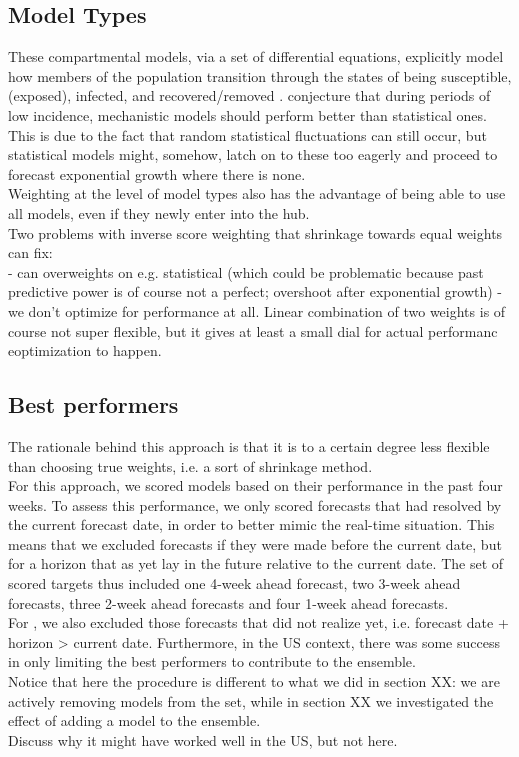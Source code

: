 \subsection{Model Types}
These compartmental models, via a set of differential equations, explicitly model how members of the population transition through the states of being susceptible, (exposed), infected, and recovered/removed \cite{taylor_combining_2021}.
\cite{taylor_combining_2021} conjecture that during periods of low incidence, mechanistic models should perform better than statistical ones. This is due to the fact that random statistical fluctuations can still occur, but statistical models might, somehow, latch on to these too eagerly and proceed to forecast exponential growth where there is none.\\
Weighting at the level of model types also has the advantage of being able to use all models, even if they newly enter into the hub.\\
Two problems with inverse score weighting that shrinkage towards equal weights can fix: \\
- can overweights on e.g. statistical (which could be problematic because past predictive power is of course not a perfect; overshoot after exponential growth)
- we don't optimize for performance at all. Linear combination of two weights is of course not super flexible, but it gives at least a small dial for actual performanc eoptimization to happen. 
\subsection{Best performers}
The rationale behind this approach is that it is to a certain degree less flexible than choosing true weights, i.e. a sort of shrinkage method.\\
For this approach, we scored models based on their performance in the past four weeks. To assess this performance, we only scored forecasts that had resolved by the current forecast date, in order to better mimic the real-time situation. This means that we excluded forecasts if they were made before the current date, but for a horizon that as yet lay in the future relative to the current date. The set of scored targets thus included one 4-week ahead forecast, two 3-week ahead forecasts, three 2-week ahead forecasts and four 1-week ahead forecasts.\\
For , we also excluded those forecasts that did not realize yet, i.e. forecast date + horizon > current date.
Furthermore, in the US context, there was some success in only limiting the best performers to contribute to the ensemble.\\
Notice that here the procedure is different to what we did in section XX: we are actively removing models from the set, while in section XX we investigated the effect of adding a model to the ensemble.\\
Discuss why it might have worked well in the US, but not here.
